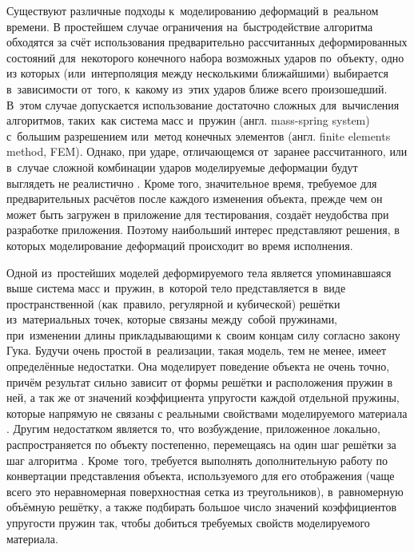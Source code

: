\documentclass[a4paper, 14pt, titlepage]{extarticle}
\newcommand{\eng}[1]{{\English #1}}
\begin{document}
    Существуют различные подходы к~моделированию деформаций в~реальном времени. В простейшем случае
    ограничения на~быстродействие алгоритма обходятся за счёт использования предварительно рассчитанных
    деформированных состояний для~некоторого конечного набора возможных ударов по~объекту, одно из которых
    (или~интерполяция между несколькими ближайшими) выбирается в~зависимости от~того, к~какому
    из~этих ударов ближе всего произошедший. В~этом случае допускается использование достаточно сложных
    для~вычисления алгоритмов, таких~как система масс и~пружин (англ. \eng{mass-spring system})
    с~большим разрешением или~метод конечных элементов (англ. \eng{finite elements method, FEM}).
    Однако, при ударе, отличающемся от~заранее рассчитанного, или в~случае сложной комбинации ударов
    моделируемые деформации будут выглядеть не реалистично \cite[с.~1064]{chang-crash}. Кроме того, значительное время, требуемое
    для предварительных расчётов после каждого изменения объекта, прежде чем он может быть загружен
    в приложение для тестирования, создаёт неудобства при разработке приложения. Поэтому наибольший
    интерес представляют решения, в которых моделирование деформаций происходит во время исполнения.

    Одной из~простейших моделей деформируемого тела является упоминавшаяся выше система масс
    и~пружин, в~которой тело представляется в~виде пространственной (как~правило, регулярной и
    кубической) решётки из~материальных точек, которые связаны между~собой пружинами, при~изменении длины
    прикладывающими к~своим концам силу согласно закону Гука. Будучи очень простой в~реализации,
    такая модель, тем не менее, имеет определённые недостатки. Она моделирует поведение объекта не
    очень точно, причём результат сильно зависит от формы решётки и расположения пружин в ней, а так же от
    значений коэффициента упругости каждой отдельной пружины, которые напрямую не связаны с
    реальными свойствами моделируемого материала \cite[с.~8]{mueller-physmodels}.
    Другим недостатком является то, что возбуждение, приложенное локально, распространяется по
    объекту постепенно, перемещаясь на один шаг решётки за шаг алгоритма \cite[с.~232]{parent-animation}.
    Кроме~того, требуется выполнять дополнительную работу по конвертации представления объекта,
    используемого для его отображения (чаще всего это неравномерная поверхностная сетка из
    треугольников), в~равномерную объёмную решётку, а также подбирать большое число значений
    коэффициентов упругости пружин так, чтобы добиться требуемых свойств моделируемого материала.
\end{document}
